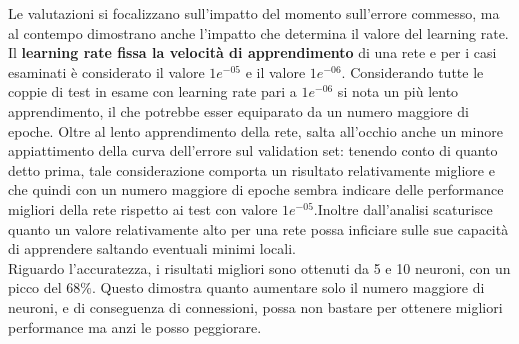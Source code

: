 Le valutazioni si focalizzano sull'impatto del momento sull'errore commesso, ma al contempo dimostrano anche l'impatto che determina il valore del learning rate. Il \textbf{learning rate fissa la velocità di apprendimento} di una rete e per i casi esaminati è considerato il valore $1e^{-05}$ e il valore $1e^{-06}$. Considerando tutte le coppie di test in esame con learning rate pari a $1e^{-06}$ si nota un più lento apprendimento, il che potrebbe esser equiparato da un numero maggiore di epoche. Oltre al lento apprendimento della rete, salta all'occhio anche un minore appiattimento della curva dell'errore sul validation set: tenendo conto di quanto detto prima, tale considerazione comporta un risultato relativamente migliore e che quindi con un numero maggiore di epoche sembra indicare delle performance migliori della rete rispetto ai test con valore $1e^{-05}$.Inoltre dall'analisi scaturisce quanto un valore relativamente alto per una rete possa inficiare sulle sue capacità di apprendere saltando eventuali minimi locali. \\
Riguardo l'accuratezza, i risultati migliori sono ottenuti da 5 e 10 neuroni, con un picco del $68\%$. Questo dimostra quanto aumentare solo il numero maggiore di neuroni, e di conseguenza di connessioni, possa non bastare per ottenere migliori performance ma anzi le posso peggiorare.  